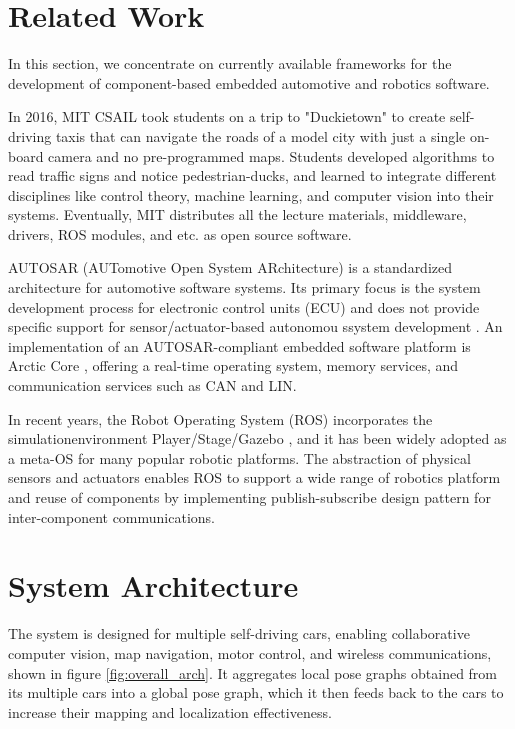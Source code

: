 \documentclass[conference]{IEEEtran}
\begin{document}
\section{Related Work}

In this section, we concentrate on currently available frameworks for the development of component-based embedded automotive and robotics software.

In 2016, MIT CSAIL took students on a trip to "Duckietown" \cite{Duckietown} to create self-driving taxis that can navigate the roads of a model city with just a single on-board camera and no pre-programmed maps. Students developed algorithms to read traffic signs and notice pedestrian-ducks, and learned to integrate different disciplines like control theory, machine learning, and computer vision into their systems. Eventually, MIT distributes all the lecture materials, middleware, drivers, ROS modules, and etc. as open source software.

AUTOSAR (AUTomotive Open System ARchitecture) is a standardized architecture for automotive software systems. Its primary focus is the system development process for electronic control units (ECU) and does not provide specific support for sensor/actuator-based autonomou ssystem development \cite{rtes}. An implementation of an AUTOSAR-compliant embedded software platform is Arctic Core \cite{arctic-core}, offering a real-time operating system, memory services, and communication services such as CAN and LIN.

In recent years, the Robot Operating System (ROS) \cite{ROS} incorporates the simulationenvironment Player/Stage/Gazebo \cite{player/stage}, and it has been widely adopted as a meta-OS for many popular robotic platforms. The abstraction of physical sensors and actuators enables ROS to support a wide range of robotics platform and reuse of components by implementing publish-subscribe design pattern for inter-component communications.

\section{System Architecture}

The system is designed for multiple self-driving cars, enabling collaborative computer vision, map navigation, motor control, and wireless communications, shown in figure \ref{fig:overall_arch}. It aggregates local pose graphs obtained from its multiple cars into a global pose graph, which it then feeds back to the cars to increase their mapping and localization effectiveness.
\end{document}
